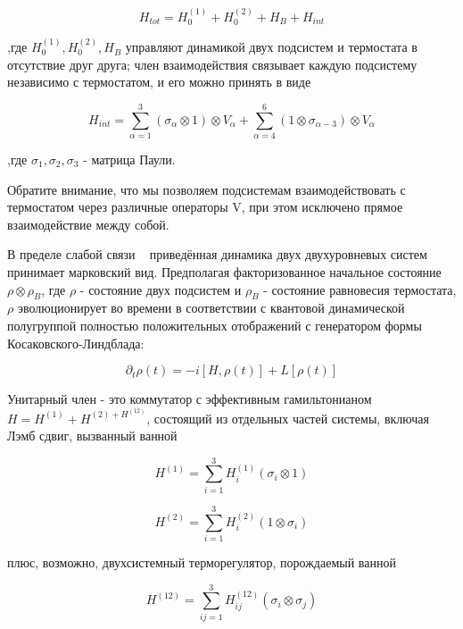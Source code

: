 \documentclass[11pt]{article}
\begin{document}
\begin{equation}
H_{tot}=H_0^{(1)}+H_0^{(2)}+H_B+H_{int}
\label{eq_1}
\end{equation}

,где $H_0^{(1)},H_0^{(2)},H_B$ управляют динамикой двух подсистем и термостата в отсутствие друг друга; член взаимодействия связывает каждую подсистему независимо с термостатом, и его можно принять в виде

\begin{equation}
H_{int}=\sum\limits_{\alpha=1}^3(\sigma_\alpha \otimes 1) \otimes V_\alpha + \sum\limits_{\alpha=4}^6(1 \otimes \sigma_{\alpha-3}) \otimes V_{\alpha}
\label{eq_2}
\end{equation}

,где $\sigma_1, \sigma_2, \sigma_3$ - матрица Паули.

Обратите внимание, что мы позволяем подсистемам взаимодействовать с термостатом через различные операторы V, при этом исключено прямое взаимодействие между собой.

В пределе слабой связи ~\cite{b7,b8,b9,b10,b11,b12} приведённая динамика двух двухуровневых систем принимает марковский вид. Предполагая факторизованное начальное состояние $\rho \otimes \rho_B$, где $\rho$ - состояние двух подсистем и $\rho_B$ - состояние равновесия термостата, $\rho$ эволюционирует во времени в соответствии с квантовой динамической полугруппой полностью положительных отображений с генератором формы Косаковского-Линдблада:

\begin{equation}
\partial_t\rho(t) = -i[H,\rho(t)]+L[\rho(t)]
\label{eq_3}
\end{equation}
 
Унитарный член - это коммутатор с эффективным гамильтонианом $H=H^{(1)}+H^{(2)+H^{(12)}}$, состоящий из отдельных частей системы, включая Лэмб сдвиг, вызванный ванной

\begin{equation*}
H^{(1)}=\sum\limits_{i=1}^3H_i^{(1)}(\sigma_i \otimes 1)
\end{equation*}

\begin{equation}
H^{(2)}=\sum\limits_{i=1}^3H_i^{(2)}(1 \otimes \sigma_i)
\label{eq_4}
\end{equation}

плюс, возможно, двухсистемный терморегулятор, порождаемый ванной

\begin{equation}
H^{(12)}=\sum\limits_{ij=1}^3H_{ij}^{(12)}(\sigma_i \otimes \sigma_j)
\label{eq_5}
\end{equation}
\end{document}
